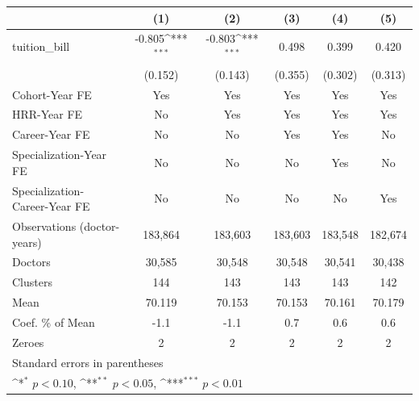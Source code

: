 {
\def\sym#1{\ifmmode^{#1}\else\(^{#1}\)\fi}
\begin{tabular}{l*{5}{c}}
\hline\hline
                    &\multicolumn{1}{c}{(1)}         &\multicolumn{1}{c}{(2)}         &\multicolumn{1}{c}{(3)}         &\multicolumn{1}{c}{(4)}         &\multicolumn{1}{c}{(5)}         \\
\hline
tuition\_bill        &      -0.805\sym{***}&      -0.803\sym{***}&       0.498         &       0.399         &       0.420         \\
                    &     (0.152)         &     (0.143)         &     (0.355)         &     (0.302)         &     (0.313)         \\
[1em]
Cohort-Year FE      &         Yes         &         Yes         &         Yes         &         Yes         &         Yes         \\
[1em]
HRR-Year FE         &          No         &         Yes         &         Yes         &         Yes         &         Yes         \\
[1em]
Career-Year FE      &          No         &          No         &         Yes         &         Yes         &          No         \\
[1em]
Specialization-Year FE&          No         &          No         &          No         &         Yes         &          No         \\
[1em]
Specialization-Career-Year FE&          No         &          No         &          No         &          No         &         Yes         \\
\hline
Observations (doctor-years)&     183,864         &     183,603         &     183,603         &     183,548         &     182,674         \\
Doctors             &      30,585         &      30,548         &      30,548         &      30,541         &      30,438         \\
Clusters            &         144         &         143         &         143         &         143         &         142         \\
Mean                &      70.119         &      70.153         &      70.153         &      70.161         &      70.179         \\
Coef. \% of Mean    &        -1.1         &        -1.1         &         0.7         &         0.6         &         0.6         \\
Zeroes              &           2         &           2         &           2         &           2         &           2         \\
\hline\hline
\multicolumn{6}{l}{\footnotesize Standard errors in parentheses}\\
\multicolumn{6}{l}{\footnotesize \sym{*} \(p<0.10\), \sym{**} \(p<0.05\), \sym{***} \(p<0.01\)}\\
\end{tabular}
}
